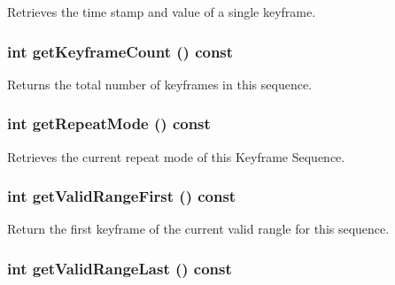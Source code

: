 Retrieves the time stamp and value of a single keyframe. \hypertarget{classm3g_1_1KeyframeSequence_4d500a603f25adafd8e6f8b68872dbff}{
\subsubsection[{getKeyframeCount}]{\setlength{\rightskip}{0pt plus 5cm}int getKeyframeCount () const}}
\label{classm3g_1_1KeyframeSequence_4d500a603f25adafd8e6f8b68872dbff}


Returns the total number of keyframes in this sequence. \hypertarget{classm3g_1_1KeyframeSequence_a356af60b9759d5d3da833773e3c7b73}{
\subsubsection[{getRepeatMode}]{\setlength{\rightskip}{0pt plus 5cm}int getRepeatMode () const}}
\label{classm3g_1_1KeyframeSequence_a356af60b9759d5d3da833773e3c7b73}


Retrieves the current repeat mode of this Keyframe Sequence. \hypertarget{classm3g_1_1KeyframeSequence_b7e54386674cefdb8f5fa65ce5435b50}{
\subsubsection[{getValidRangeFirst}]{\setlength{\rightskip}{0pt plus 5cm}int getValidRangeFirst () const}}
\label{classm3g_1_1KeyframeSequence_b7e54386674cefdb8f5fa65ce5435b50}


Return the first keyframe of the current valid rangle for this sequence. \hypertarget{classm3g_1_1KeyframeSequence_aa98cc8d698c482c33a3487c33db27d0}{
\subsubsection[{getValidRangeLast}]{\setlength{\rightskip}{0pt plus 5cm}int getValidRangeLast () const}}
\label{classm3g_1_1KeyframeSequence_aa98cc8d698c482c33a3487c33db27d0}



